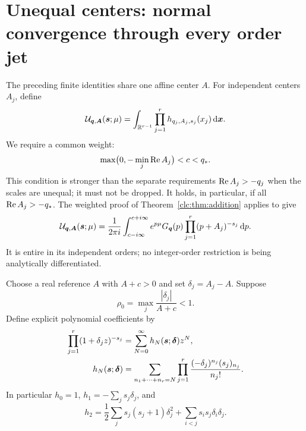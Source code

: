 \section{Unequal centers: normal convergence through every order jet}
\label{clc:sec:unequal}

The preceding finite identities share one affine center $A$.
For independent centers $A_j$, define
\begin{equation}\label{clc:eq:U}
 \mathcal U_{\boldsymbol q,\boldsymbol A}(\boldsymbol s;\mu)=
 \int_{\mathbb R^{r-1}}\prod_{j=1}^r h_{q_j,A_j,s_j}(x_j)
             \,\mathrm d\boldsymbol x.
\end{equation}
We require a common weight:
\begin{equation}\label{clc:eq:unequal-strip}
 \max\bigl(0,-\min_j\operatorname{Re} A_j\bigr)<c<q_*.
\end{equation}
This condition is stronger than the separate requirements
$\operatorname{Re} A_j>-q_j$ when the scales are unequal; it must not be dropped.
It holds, in particular, if all $\operatorname{Re} A_j>-q_*$.
The weighted proof of Theorem~\ref{clc:thm:addition} applies to give
\begin{equation}\label{clc:eq:U-contour}
 \mathcal U_{\boldsymbol q,\boldsymbol A}(\boldsymbol s;\mu)=\frac1{2\pi i}
 \int_{c-i\infty}^{c+i\infty}e^{p\mu}G_{\boldsymbol q}(p)
                \prod_{j=1}^r(p+A_j)^{-s_j}\,\mathrm d p.
\end{equation}
It is entire in its independent orders; no integer-order restriction is
being analytically differentiated.

Choose a real reference $A$ with $A+c>0$ and set $\delta_j=A_j-A$.
Suppose
\begin{equation}\label{clc:eq:rho-condition}
 \rho_0=\max_j\frac{|\delta_j|}{A+c}<1.
\end{equation}
Define explicit polynomial coefficients by
\begin{align}
 \prod_{j=1}^r(1+\delta_jz)^{-s_j}
   &=\sum_{N=0}^\infty h_N(\boldsymbol s;\boldsymbol\delta)z^N,\label{clc:eq:hN-gen}\\
 h_N(\boldsymbol s;\boldsymbol\delta)
   &=\sum_{n_1+\cdots+n_r=N}
       \prod_{j=1}^r\frac{(-\delta_j)^{n_j}(s_j)_{n_j}}{n_j!}.
 \label{clc:eq:hN}
\end{align}
In particular $h_0=1$, $h_1=-\sum_js_j\delta_j$, and
\[
 h_2=\frac12\sum_js_j(s_j+1)\delta_j^2
                 +\sum_{i<j}s_is_j\delta_i\delta_j.
\]

